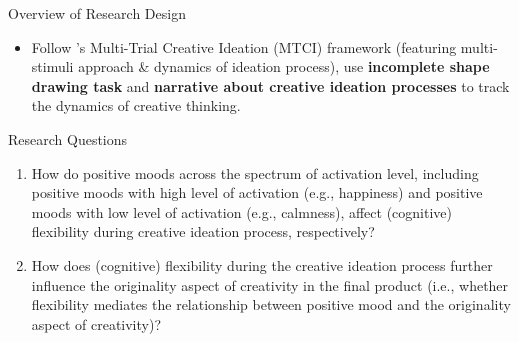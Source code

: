 \documentclass[pdf]{beamer}
\begin{document}
\begin{frame}{Overview of Research Design}
\begin{itemize}
    \item<1-> Follow \textcite{barbot_dynamics_2018}'s Multi-Trial Creative Ideation (MTCI) framework (featuring multi-stimuli approach \& dynamics of ideation process), use \textbf{incomplete shape drawing task} and \textbf{narrative about creative ideation processes} to track the dynamics of creative thinking.
\end{itemize}
\end{frame}

{
\begin{frame}{Research Questions}
\begin{enumerate}
    \item<1> How do positive moods across the spectrum of activation level, including positive moods with high level of activation (e.g., happiness) and positive moods with low level of activation (e.g., calmness), affect (cognitive) flexibility during creative ideation process, respectively? 
    \item<2> How does (cognitive) flexibility during the creative ideation process further influence the originality aspect of creativity in the final product (i.e., whether flexibility mediates the relationship between positive mood and the originality aspect of creativity)?
\end{enumerate}
\end{frame}
}
\end{document}
